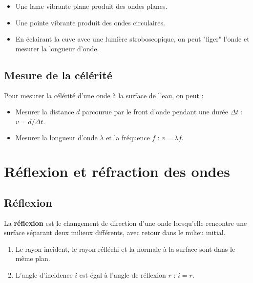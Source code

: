 \begin{experience}
\begin{itemize}
    \item Une lame vibrante plane produit des ondes planes.
    \item Une pointe vibrante produit des ondes circulaires.
    \item En éclairant la cuve avec une lumière stroboscopique, on peut "figer" l'onde et mesurer la longueur d'onde.
\end{itemize}
\end{experience}


\subsection{Mesure de la célérité}

Pour mesurer la célérité d'une onde à la surface de l'eau, on peut :
\begin{itemize}
    \item Mesurer la distance $d$ parcourue par le front d'onde pendant une durée $\Delta t$ : $v = d/\Delta t$.
    \item Mesurer la longueur d'onde $\lambda$ et la fréquence $f$ : $v = \lambda f$.
\end{itemize}

\section{Réflexion et réfraction des ondes}

\subsection{Réflexion}

\begin{definition}[Réflexion]
La \textbf{réflexion} est le changement de direction d'une onde lorsqu'elle rencontre une surface séparant deux milieux différents, avec retour dans le milieu initial.
\end{definition}

\begin{loi}
\begin{enumerate}
    \item Le rayon incident, le rayon réfléchi et la normale à la surface sont dans le même plan.
    \item L'angle d'incidence $i$ est égal à l'angle de réflexion $r$ : $\boxed{i = r}$.
\end{enumerate}
\end{loi}


